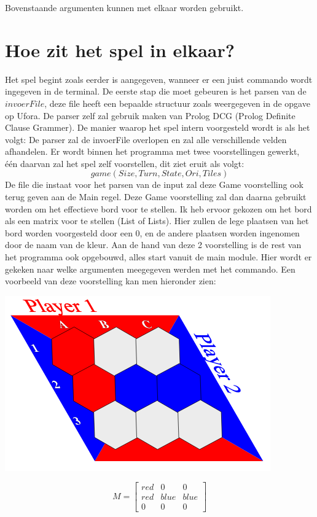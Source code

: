 \documentclass{article}
\begin{document}
Bovenstaande argumenten kunnen met elkaar worden gebruikt. 

\section{Hoe zit het spel in elkaar?}

Het spel begint zoals eerder is aangegeven, wanneer er een juist commando wordt ingegeven in de terminal. De eerste stap die moet gebeuren is het parsen van de $invoerFile$, deze file heeft een bepaalde structuur zoals weergegeven in de opgave op Ufora. De parser zelf zal gebruik maken van Prolog DCG (Prolog Definite Clause Grammer). \newline
De manier waarop het spel intern voorgesteld wordt is als het volgt: De parser zal de invoerFile overlopen en zal alle verschillende velden afhandelen. Er wordt binnen het programma met twee voorstellingen gewerkt, één daarvan zal het spel zelf voorstellen, dit ziet eruit als volgt: 
$$
game(Size, Turn, State, Ori, Tiles)
$$
De file die instaat voor het parsen van de input zal deze Game voorstelling ook terug geven aan de Main regel. Deze Game voorstelling zal dan daarna gebruikt worden om het effectieve bord voor te stellen. Ik heb ervoor gekozen om het bord als een matrix voor te stellen (List of Lists). Hier zullen de lege plaatsen van het bord worden voorgesteld door een 0, en de andere plaatsen worden ingenomen door de naam van de kleur. 
Aan de hand van deze 2 voorstelling is de rest van het programma ook opgebouwd, alles start vanuit de main module. Hier wordt er gekeken naar welke argumenten meegegeven werden met het commando.\newline
Een voorbeeld van deze voorstelling kan men hieronder zien:\newline
\begin{center}
\includegraphics[scale=0.4]{board}
\end{center}
\[
M=
  \begin{bmatrix}
    red & 0 & 0 \\
    red & blue & blue \\
    0 & 0 & 0
  \end{bmatrix}
\]
\end{document}
